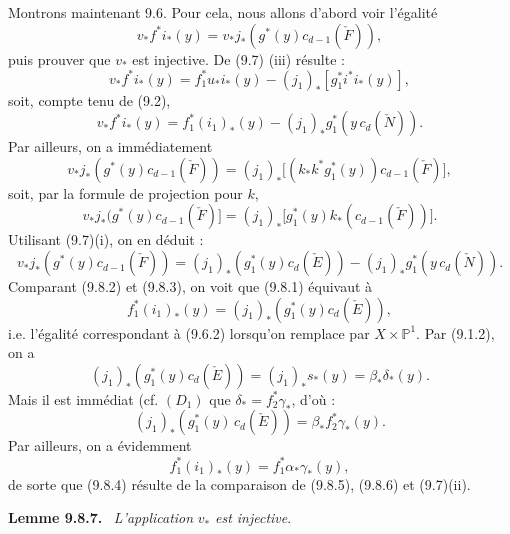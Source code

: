 \documentclass[11pt]{article}
\newenvironment{statement}[1]{\par\medskip\noindent\textbf{#1.}\ }{\par\medskip}
\begin{document}
Montrons maintenant 9.6. Pour cela, nous allons d'abord voir l'égalité
\[
v_*f^*i_*(y)=v_*j_*(g^*(y)c_{d-1}(\check F)),
\tag{9.8.1}
\]
puis prouver que $v_*$ est injective. De (9.7) (iii) résulte :
\[
v_*f^*i_*(y)=f_1^*u_*i_*(y)-(j_1)_*[g_1^*i^*i_*(y)],
\]
soit, compte tenu de (9.2),
\[
v_*f^*i_*(y)=f_1^*(i_1)_*(y)-(j_1)_*g_1^*(y\,c_d(\check N)).
\tag{9.8.2}
\]
Par ailleurs, on a immédiatement
\[
v_*j_*(g^*(y)c_{d-1}(\check F))
=(j_1)_*\bigl[(k_*k^*g_1^*(y))c_{d-1}(\check F)\bigr],
\]
soit, par la formule de projection pour $k$,
\[
v_*j_*(g^*(y)c_{d-1}(\check F)]
=(j_1)_*\bigl[g_1^*(y)k_*(c_{d-1}(\check F))\bigr].
\]
Utilisant (9.7)(i), on en déduit :
\[
v_*j_*(g^*(y)c_{d-1}(\check F))
=(j_1)_*(g_1^*(y)c_d(\check E))-(j_1)_*g_1^*(y\,c_d(\check N)).
\tag{9.8.3}
\]
Comparant (9.8.2) et (9.8.3), on voit que (9.8.1) équivaut à
\[
f_1^*(i_1)_*(y)=(j_1)_*(g_1^*(y)c_d(\check E)),
\tag{9.8.4}
\]
i.e. l'égalité correspondant à (9.6.2) lorsqu'on remplace par $X\times\mathbb P^1$. Par (9.1.2), on a
\[
(j_1)_*(g_1^*(y)c_d(\check E))=(j_1)_*s_*(y)=\beta_*\delta_*(y).
\]
Mais il est immédiat (cf. $(D_1)$ que $\delta_*=f_2^*\gamma_*$, d'où :
\[
(j_1)_*(g_1^*(y)\,c_d(\check E))=\beta_*f_2^*\gamma_*(y).
\tag{9.8.5}
\]
Par ailleurs, on a évidemment
\[
f_1^*(i_1)_*(y)=f_1^*\alpha_*\gamma_*(y),
\tag{9.8.6}
\]
de sorte que (9.8.4) résulte de la comparaison de (9.8.5), (9.8.6) et (9.7)(ii).

\begin{statement}{Lemme 9.8.7}
\emph{L'application} $v_*$ \emph{est injective}.
\end{statement}
\end{document}
